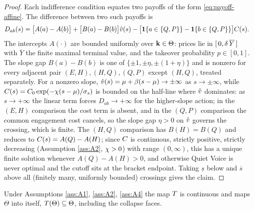 \begin{proof}
Each indifference condition equates two payoffs of the form
\eqref{eq:payoff-affine}. The difference between two such payoffs is
\begin{equation}
\label{eq:diff}
D_{ab}(s)=\bigl[A(a)-A(b)\bigr]+\bigl[B(a)-B(b)\bigr]\hat{v}(s)
-\bigl[\mathbf{1}\{a\in\{Q,P\}\}-\mathbf{1}\{b\in\{Q,P\}\}\bigr]C(s).
\end{equation}
The intercepts $A(\cdot)$ are bounded uniformly over $\mathbf{k}\in\Theta$: prices lie
in $[\,0,\delta\,\overline{Y}\,]$ with $\overline{Y}$ the finite maximal
terminal value, and the takeover probability $p\in[0,1]$. The slope gap
$B(a)-B(b)$ is one of $\{\pm1,\pm\eta,\pm(1+\eta)\}$ and is nonzero for every
adjacent pair $(E,H),(H,Q),(Q,P)$ except $(H,Q)$, treated separately. For a
nonzero slope, $\hat{v}(s)=\mu+\beta(s-\mu)\to\pm\infty$ as $s\to\pm\infty$, while
$C(s)=C_0\exp(-\chi(s-\mu)/\sigma_s)$ is bounded on the half-line where
$\hat{v}$ dominates: as $s\to+\infty$ the linear term forces $D_{ab}\to+\infty$ for
the higher-slope action; in the $(E,H)$ comparison the cost term is absent, and
in the $(Q,P)$ comparison the common engagement cost cancels, so the slope gap
$\eta>0$ on $\hat{v}$ governs the crossing, which is finite. The $(H,Q)$ comparison
has $B(H)=B(Q)$ and reduces to $C(s)=A(Q)-A(H)$; since $C$ is
continuous, strictly positive, strictly decreasing (Assumption \ref{ass:A2},
$\chi>0$) with range $(0,\infty)$, this has a unique finite solution whenever
$A(Q)-A(H)>0$, and otherwise Quiet Voice is never optimal and the cutoff sits at
the bracket endpoint. Taking $\underline{s}$ below and $\overline{s}$ above all
(finitely many, uniformly bounded) crossings gives the claim.
\end{proof}

\begin{lemma}
\label{lem:selfmap}
Under Assumptions \ref{ass:A1}, \ref{ass:A2}, \ref{ass:A4} the map $T$ is
continuous and maps $\Theta$ into itself, $T(\Theta)\subseteq\Theta$,
including the collapse faces.
\end{lemma}

